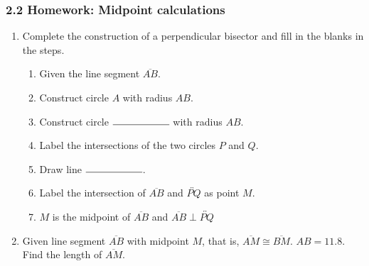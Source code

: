 \documentclass[12pt, twoside]{article}
\begin{document}
  \subsubsection*{2.2 Homework: Midpoint calculations}

    \begin{enumerate}
      \item Complete the construction of a perpendicular bisector and fill in the blanks in the steps.
      \begin{enumerate}
        \item Given the line segment $\overline{AB}$.
        \item Construct circle $A$ with radius $AB$.
        \bigskip
        \item Construct circle $\rule{2cm}{0.15mm}$  with radius $AB$. 
        \item Label the intersections of the two circles $P$ and $Q$. \bigskip
        \item Draw line $\rule{2cm}{0.15mm}$.
        \item Label the intersection of $\overline{AB}$ and $\overleftrightarrow{PQ}$ as point $M$.
        \item $M$ is the midpoint of $\overline{AB}$ and $\overline{AB} \perp \overleftrightarrow{PQ}$
      \end{enumerate}
      \vspace{7cm}
      \begin{center}
      \end{center}

\newpage

\item Given line segment $\overline{AB}$ with midpoint $M$, that is, $\overline{AM} \cong \overline{BM}$. $AB=11.8$. Find the length of $\overline{AM}$.\\[0.75cm]
\vspace{3cm}


\end{enumerate}
\end{document}

